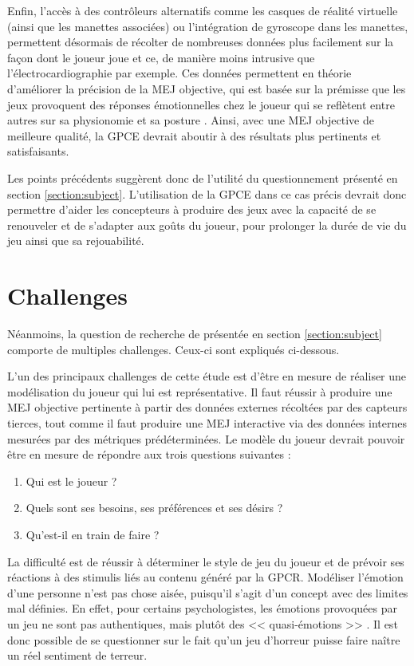 \documentclass[a4paper,11pt]{article}
\begin{document}
      Enfin, l'accès à des contrôleurs alternatifs comme les casques de réalité virtuelle (ainsi que les manettes associées) ou l'intégration de gyroscope dans les manettes, permettent désormais de récolter de nombreuses données plus facilement sur la façon dont le joueur joue et ce, de manière moins intrusive que l'électrocardiographie par exemple.
      Ces données permettent en théorie d'améliorer la précision de la MEJ objective, qui est basée sur la prémisse que les jeux provoquent des réponses émotionnelles chez le joueur qui se reflètent entre autres sur sa physionomie et sa posture \cite{Yannakakis}.
      Ainsi, avec une MEJ objective de meilleure qualité, la GPCE devrait aboutir à des résultats plus pertinents et satisfaisants.
      
      Les points précédents suggèrent donc de l'utilité du questionnement présenté en section \ref{section:subject}.
      L'utilisation de la GPCE dans ce cas précis devrait donc permettre d'aider les concepteurs à produire des jeux avec la capacité de se renouveler et de s'adapter aux goûts du joueur, pour prolonger la durée de vie du jeu ainsi que sa rejouabilité.


    \section{Challenges}\label{section:challenges}
      
      Néanmoins, la question de recherche de présentée en section \ref{section:subject} comporte de multiples challenges.
      Ceux-ci sont expliqués ci-dessous.
     
      L'un des principaux challenges de cette étude est d'être en mesure de réaliser une modélisation du joueur qui lui est représentative.
      Il faut réussir à produire une MEJ objective pertinente à partir des données externes récoltées par des capteurs tierces, tout comme il faut produire une MEJ interactive via des données internes mesurées par des métriques prédéterminées.
      Le modèle du joueur devrait pouvoir être en mesure de répondre aux trois questions suivantes \cite{Bakkes} :
      \begin{enumerate}
        \item Qui est le joueur ?
        \item Quels sont ses besoins, ses préférences et ses désirs ?
        \item Qu'est-il en train de faire ?
      \end{enumerate}
      La difficulté est de réussir à déterminer le style de jeu du joueur et de prévoir ses réactions à des stimulis liés au contenu généré par la GPCR.
      Modéliser l'émotion d'une personne n'est pas chose aisée, puisqu'il s'agit d'un concept avec des limites mal définies. 
      En effet, pour certains psychologistes, les émotions provoquées par un jeu ne sont pas authentiques, mais plutôt des << quasi-émotions >> \cite{Walton}. 
      Il est donc possible de se questionner sur le fait qu'un jeu d'horreur puisse faire naître un réel sentiment de terreur.
\end{document}
